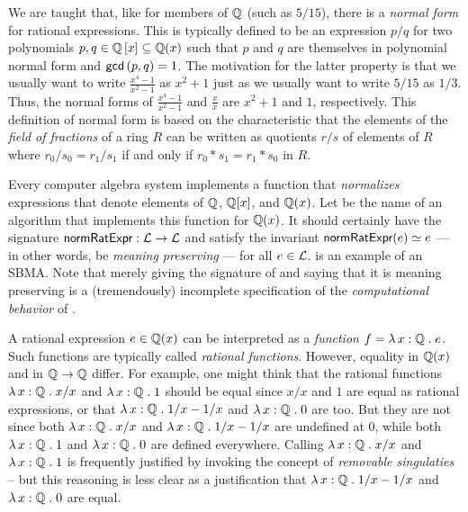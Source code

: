 \documentclass[fleqn]{llncs}
\begin{document}
We are taught that, like for members of $\mathbb{Q}$ (such as $5/15$), there
is a \emph{normal form} for rational expressions. This is typically
defined to be an expression $p/q$ for two polynomials $p,q \in
\mathbb{Q}\left[x\right] \subseteq \mathbb{Q}(x)$ such that $p$ and $q$ are
themselves in polynomial normal form and $\mbox{\sf gcd}\left(p,q\right)
= 1$.  The motivation for the latter property is that we usually want
to write $\frac{x^4-1}{x^2-1}$ as $x^2 + 1$ just as we usually want to
write $5/15$ as $1/3$.  Thus, the normal forms of
$\frac{x^4-1}{x^2-1}$ and $\frac{x}{x}$ are $x^2 + 1$ and $1$,
respectively.  This definition of normal form is based on the
characteristic that the elements of the \emph{field of fractions} of a
ring $R$ can be written as quotients $r/s$ of elements of $R$ where
$r_0/s_0 = r_1/s_1$ if and only if $r_0 * s_1 = r_1 * s_0$ in $R$.

Every computer algebra system implements a function that \emph{normalizes}
expressions that denote elements of $\mathbb{Q}$, $\mathbb{Q}[x]$, and $\mathbb{Q}(x)$.  Let {\NRE}
be the name of an algorithm that implements this function for $\mathbb{Q}(x)$.  It
should certainly have the signature $\mbox{\sf normRatExpr} : \mathcal{L} \rightarrow \mathcal{L}$ and
satisfy the invariant $\mbox{\sf normRatExpr}(e) \simeq e$ --- in other words, be \emph{meaning
preserving} --- for all $e \in \mathcal{L}$.  {\NRE} is an example of an SBMA.
Note that merely giving the signature of {\NRE} and saying that it is meaning
preserving is a (tremendously) incomplete specification of the
\emph{computational behavior} of {\NRE}.

\iffalse
SBMAs can be difficult to specify since they involve an interplay of
syntax and semantics.  We have to be careful of \emph{which} semantics
is used to guide the syntactic manipulations, as different semantics
for the \textbf{same} expression can be inconsistent.
\fi

A rational expression $e \in \mathbb{Q}(x)$ can be interpreted as a \emph{function}
$f = \lambda\, x : \mathbb{Q} \mathrel. e$.  Such functions are typically called
\emph{rational functions}.  However, equality in $\mathbb{Q}(x)$ and in
$\mathbb{Q}\rightarrow\mathbb{Q}$ differ.  For example, one might think that the rational
functions $\lambda\, x : \mathbb{Q} \mathrel. x/x$ and $\lambda\, x : \mathbb{Q} \mathrel.1$ should be equal since $x/x$ and
$1$ are equal as rational expressions, or that $\lambda\, x : \mathbb{Q} \mathrel.1/x - 1/x$ and
$\lambda\, x : \mathbb{Q} \mathrel.0$ are too. But they are not since both
$\lambda\, x : \mathbb{Q} \mathrel. x/x$ and $\lambda\, x : \mathbb{Q} \mathrel.1/x - 1/x$ are undefined at 0, while both
$\lambda\, x : \mathbb{Q} \mathrel.1$ and $\lambda\, x : \mathbb{Q} \mathrel.0$ are defined everywhere.  Calling $\lambda\, x : \mathbb{Q} \mathrel. x/x$
and $\lambda\, x : \mathbb{Q} \mathrel.1$ is frequently justified by invoking the concept of
\emph{removable singulaties} -- but this reasoning is less clear as a
justification that $\lambda\, x : \mathbb{Q} \mathrel.1/x - 1/x$ and $\lambda\, x : \mathbb{Q} \mathrel.0$ are equal.
\end{document}
